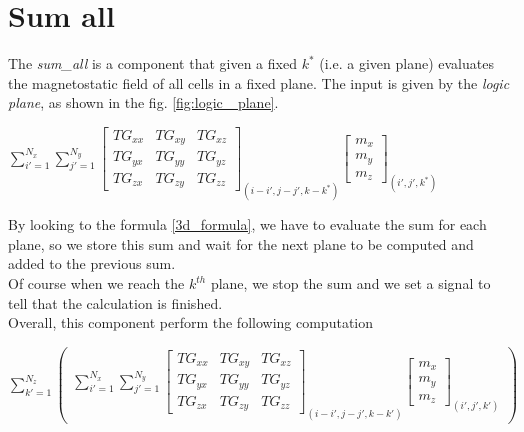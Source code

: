     \section{Sum all}
    The \textit{sum\_all} is a component that given a fixed $ k^* $ (i.e. a given plane) evaluates the magnetostatic field of all cells in a fixed plane.
    The input is given by the \textit{logic plane}, as shown in the fig. \ref{fig:logic_ plane}.
    \begin{center}
    	$ \sum\limits_{i'=1}^{N_{x}} \sum\limits_{j'=1}^{N_{y}}\begin{bmatrix}
    	TG_{xx} & TG_{xy} & TG_{xz}\\
    	TG_{yx} & TG_{yy}& TG_{yz}    	\\
    	TG_{zx}&TG_{zy} & TG_{zz}  
    	\end{bmatrix}_{(i-i',j-j',k-k^*)}\begin{bmatrix}
    	m_{x}\\
    	m_{y}\\
    	m_{z}\end{bmatrix}_{(i',j',k^*)} $
    \end{center}
    By looking to the formula \ref{3d_formula}, we have to evaluate the sum for each plane, so we store this sum and wait for the next plane to be computed and added to the previous sum.\\
    Of course when we reach the $ k^{th} $ plane, we stop the sum and we set a signal to tell that the calculation is finished.\\
    Overall, this component perform the following computation\\
    \begin{center}
    	$ \sum\limits_{k'=1}^{N_{z}}\begin{pmatrix}
    	\sum\limits_{i'=1}^{N_{x}} \sum\limits_{j'=1}^{N_{y}}\begin{bmatrix}
    	TG_{xx} & TG_{xy} & TG_{xz}\\
    	TG_{yx} & TG_{yy}& TG_{yz}    	\\
    	TG_{zx}&TG_{zy} & TG_{zz}  
    	\end{bmatrix}_{(i-i',j-j',k-k')}\begin{bmatrix}
    	m_{x}\\
    	m_{y}\\
    	m_{z}\end{bmatrix}_{(i',j',k')}
    	\end{pmatrix} $
    \end{center}
  